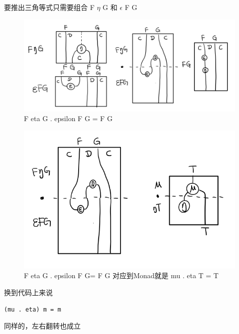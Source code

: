 \documentclass[11pt]{tufte-book}
\begin{document}
要推出三角等式只需要组合 F \(\eta\) G 和 \(\epsilon\) F G
\begin{figure}[htbp]
\centering
\includegraphics[width=.9\linewidth]{images/p1-adjunction-functor-triangle.png}
\caption{F eta G  . epsilon F G = F G}
\end{figure}
\begin{figure}[htbp]
\centering
\includegraphics[width=.9\linewidth]{images/p1-monad-triangle.png}
\caption{F eta G  . epsilon F G= F G 对应到Monad就是 mu . eta T = T}
\end{figure}

换到代码上来说
\begin{verbatim}
(mu . eta) m = m
\end{verbatim}

同样的，左右翻转也成立
\end{document}
